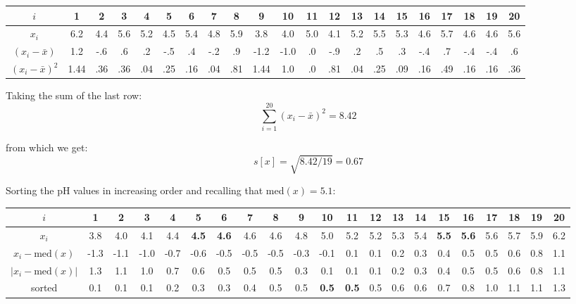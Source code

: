 \begin{center}
\begin{tabular}{c@{\tgap}|
    @{\tgap}c@{\gap}c@{\gap}c@{\gap}c@{\gap}c@{\tgap}
    @{\tgap}c@{\gap}c@{\gap}c@{\gap}c@{\gap}c@{\tgap}
    @{\tgap}c@{\gap}c@{\gap}c@{\gap}c@{\gap}c@{\tgap}
    @{\tgap}c@{\gap}c@{\gap}c@{\gap}c@{\gap}c@{\tgap}}
  $i$ & 1 & 2 & 3 & 4 & 5 & 6 & 7 & 8 & 9 & 10 &
  11 & 12 & 13 & 14 & 15 & 16 & 17 & 18 & 19 & 20 \\ \hline
  $x_i$ & 6.2 & 4.4 & 5.6 & 5.2 & 4.5 & 5.4 & 4.8 & 5.9 & 3.8 & 4.0 & 
  5.0 & 4.1 & 5.2 & 5.5 & 5.3 & 4.6 & 5.7 & 4.6 & 4.6 & 5.6 \\
  $(x_i-\bar{x})$ & 1.2 & -.6 & .6 & .2 & -.5 & .4 &
  -.2 & .9 & -1.2 & -1.0 & .0 & -.9 & .2 & .5 &
  .3 & -.4 & .7 & -.4 & -.4 & .6 \\
  $(x_i-\bar{x})^2$ & 1.44 & .36 & .36 & .04 & .25 & .16 &
  .04 & .81 & 1.44 & 1.0 & .0 & .81 & .04 & .25 & .09 &
  .16 & .49 & .16 & .16 & .36
\end{tabular}
\end{center}

Taking the sum of the last row:
\[
\sum\limits_{i=1}^{20} (x_i-\bar{x})^2 = 8.42
\]

\noindent from which we get:
\[
s[x] = \sqrt{8.42/19} = 0.67
\]

Sorting the pH values in increasing order and recalling that med$(x) = 5.1$:

\begin{center}
\begin{tabular}{c@{\tgap}|
    @{\tgap}c@{\gap}c@{\gap}c@{\gap}c@{\gap}c@{\tgap}|
    @{\tgap}c@{\gap}c@{\gap}c@{\gap}c@{\gap}c@{\tgap}|
    @{\tgap}c@{\gap}c@{\gap}c@{\gap}c@{\gap}c@{\tgap}|
    @{\tgap}c@{\gap}c@{\gap}c@{\gap}c@{\gap}c@{\tgap}} $i$ & 1 & 2 & 3
  & 4 & 5 & 6 & 7 & 8 & 9 & 10 & 11 & 12 & 13 & 14 & 15 & 16 & 17 & 18
  & 19 & 20 \\ \hline
  $x_i$ & 3.8 & 4.0 & 4.1 & 4.4 & \textbf{4.5} &
  \textbf{4.6} & 4.6 & 4.6 & 4.8 & 5.0 & 5.2 & 5.2 & 5.3 & 5.4 &
  \textbf{5.5} & \textbf{5.6} & 5.6 & 5.7 & 5.9 & 6.2 \\
  $x_i-\mbox{med}(x)$ & -1.3 & -1.1 & -1.0 & -0.7 & -0.6 & -0.5 &
  -0.5 & -0.5 & -0.3 & -0.1 & 0.1 & 0.1 & 0.2 & 0.3 & 0.4 & 0.5 & 0.5 &
  0.6 & 0.8 & 1.1 \\
  $|x_i-\mbox{med}(x)|$ & 1.3 & 1.1 & 1.0 & 0.7 & 0.6 & 0.5 &
  0.5 & 0.5 & 0.3 & 0.1 & 0.1 & 0.1 & 0.2 & 0.3 & 0.4 & 0.5 & 0.5 &
  0.6 & 0.8 & 1.1 \\
  sorted & 0.1 & 0.1 & 0.1 & 0.2 & 0.3
  & 0.3 & 0.4 & 0.5 & 0.5 & \textbf{0.5} & \textbf{0.5} & 0.5 & 0.6 &
  0.6 & 0.7 & 0.8 & 1.0 & 1.1 & 1.1 & 1.3
\end{tabular}
\end{center}

